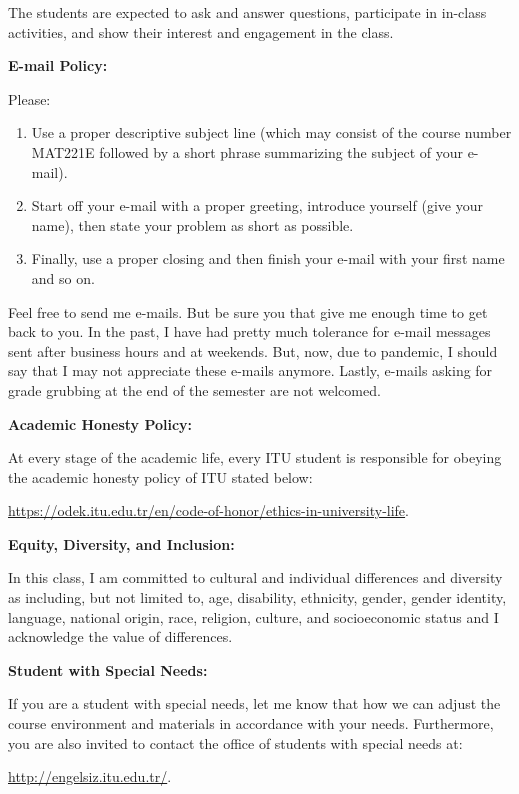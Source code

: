 \documentclass[
  12pt,
]{article}
\providecommand{\tightlist}{%
  \setlength{\itemsep}{0pt}\setlength{\parskip}{0pt}}
\begin{document}
The students are expected to ask and answer questions, participate in
in-class activities, and show their interest and engagement in the
class.

\textbf{E-mail Policy:}

Please:

\begin{enumerate}
\def\labelenumi{\arabic{enumi}.}
\tightlist
\item
  Use a proper descriptive subject line (which may consist of the course
  number MAT221E followed by a short phrase summarizing the subject of
  your e-mail).
\item
  Start off your e-mail with a proper greeting, introduce yourself (give
  your name), then state your problem as short as possible.
\item
  Finally, use a proper closing and then finish your e-mail with your
  first name and so on.
\end{enumerate}

Feel free to send me e-mails. But be sure you that give me enough time
to get back to you. In the past, I have had pretty much tolerance for
e-mail messages sent after business hours and at weekends. But, now, due
to pandemic, I should say that I may not appreciate these e-mails
anymore. Lastly, e-mails asking for grade grubbing at the end of the
semester are not welcomed.

\textbf{Academic Honesty Policy:}

At every stage of the academic life, every ITU student is responsible
for obeying the academic honesty policy of ITU stated below:

\url{https://odek.itu.edu.tr/en/code-of-honor/ethics-in-university-life}.

\textbf{Equity, Diversity, and Inclusion:}

In this class, I am committed to cultural and individual differences and
diversity as including, but not limited to, age, disability, ethnicity,
gender, gender identity, language, national origin, race, religion,
culture, and socioeconomic status and I acknowledge the value of
differences.

\textbf{Student with Special Needs:}

If you are a student with special needs, let me know that how we can
adjust the course environment and materials in accordance with your
needs. Furthermore, you are also invited to contact the office of
students with special needs at:

\url{http://engelsiz.itu.edu.tr/}.
\end{document}
